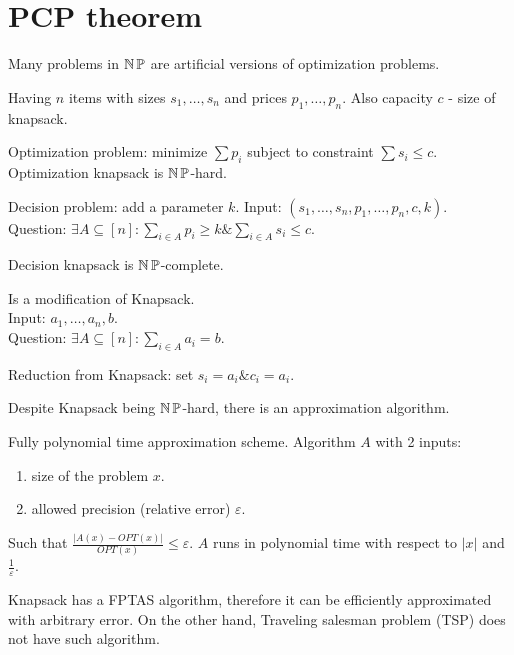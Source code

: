 \section{\texorpdfstring{PCP theorem}{PCP theorem}}
\vspace{5mm}
\large

Many problems in $\operatorname{\operatorname{\mathbb{N}}\mathbb{P}}$ are artificial versions of optimization problems.

\begin{example}[Knapsack]
	Having $n$ items with sizes $s_1, \ldots, s_n$ and prices $p_1, \ldots, p_n$.
	Also capacity $c$ - size of knapsack.

	Optimization problem: minimize $\sum p_i$ subject to constraint $\sum s_i \leq c$.
	Optimization knapsack is $\operatorname{\operatorname{\mathbb{N}}\mathbb{P}}$-hard.

	Decision problem: add a parameter $k$.
	Input: $(s_1, \ldots, s_n, p_1, \ldots, p_n, c, k)$. \\
	Question: $\exists A \subseteq [n]: \sum_{i \in A} p_i \geq k \& \sum_{i \in A} s_i \leq c$.

	Decision knapsack is $\operatorname{\operatorname{\mathbb{N}}\mathbb{P}}$-complete.
\end{example}

\begin{example}
	Is a modification of Knapsack.\\
	Input: $a_1, \ldots, a_n, b$.\\
	Question: $\exists A \subseteq [n]: \sum_{i \in A} a_i = b$.

	Reduction from Knapsack: set $s_i = a_i \& c_i = a_i$.
\end{example}

Despite Knapsack being $\operatorname{\operatorname{\mathbb{N}}\mathbb{P}}$-hard, there is an approximation algorithm.

\begin{definition}[FPTAS]
	Fully polynomial time approximation scheme.
	Algorithm $A$ with 2 inputs:
	\begin{enumerate}
		\item size of the problem $x$.
		\item allowed precision (relative error) $\varepsilon$.
	\end{enumerate}
	Such that $\frac{|A(x) - OPT(x)|}{OPT(x)} \leq \varepsilon$.
	$A$ runs in polynomial time with respect to $|x|$ and $\frac{1}{\varepsilon}$.
\end{definition}

Knapsack has a FPTAS algorithm, therefore it can be efficiently approximated with arbitrary error.
On the other hand, Traveling salesman problem (TSP) does not have such algorithm.

